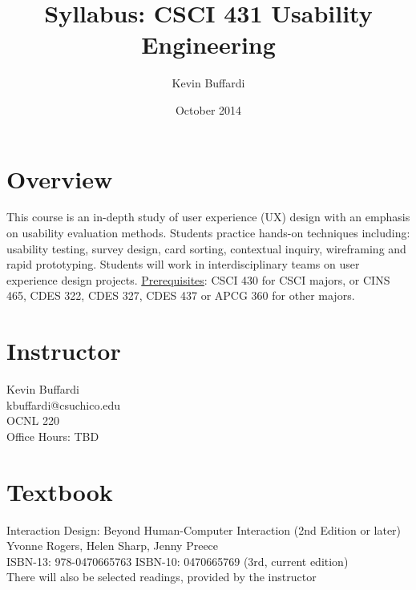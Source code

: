 \documentclass[12pt]{article}
\title{Syllabus: CSCI 431 Usability Engineering}
\author{Kevin Buffardi}
\date{October 2014}
\begin{document}
  \maketitle
  \section*{Overview}	 
  \noindent
  This course is an in-depth study of user experience (UX) design with an emphasis on usability evaluation methods. Students practice hands-on techniques including: usability testing, survey design, card sorting, contextual inquiry, wireframing and rapid prototyping. Students will work in interdisciplinary teams on user experience design projects.
  \newline
  \newline
  \underline{Prerequisites}: CSCI 430 for CSCI majors, or CINS 465, CDES 322, CDES 327, CDES 437 or APCG 360 for other majors.
  
  \section*{Instructor}
  \noindent
  Kevin Buffardi \\
  kbuffardi@csuchico.edu \\
  OCNL 220 \\
  Office Hours: TBD\\

  \section*{Textbook}
  \noindent
  Interaction Design: Beyond Human-Computer Interaction (2nd Edition or later) \\
  Yvonne Rogers, Helen Sharp, Jenny Preece \\
  ISBN-13: 978-0470665763  ISBN-10: 0470665769 (3rd, current edition) \\
  \newline
  There will also be selected readings, provided by the instructor
\end{document}
